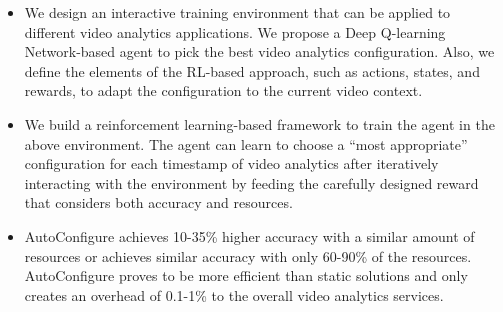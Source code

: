 \begin{itemize}	
	\item We design an interactive training environment that can be applied to different video analytics applications. We propose a Deep Q-learning Network-based \cite{DQN} agent to pick the best video analytics configuration. Also, we define the elements of the RL-based approach, such as actions, states, and rewards, to adapt the configuration to the current video context.
	
	\item We build a reinforcement learning-based framework to train the agent in the above environment. The agent can learn to choose a ``most appropriate'' configuration for each timestamp of video analytics after iteratively interacting with the environment by feeding the carefully designed reward that considers both accuracy and resources.
	
	\item AutoConfigure achieves 10-35\% higher accuracy with a similar amount of resources or achieves similar accuracy with only 60-90\% of the resources. AutoConfigure proves to be more efficient than static solutions and only creates an overhead of 0.1-1\% to the overall video analytics services.
\end{itemize}

